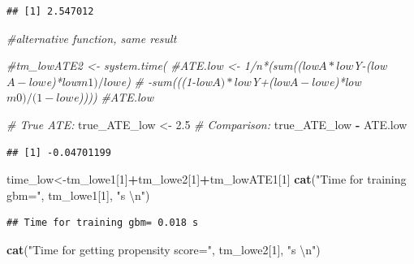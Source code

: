 \documentclass[]{article}
\newenvironment{Shaded}{\begin{snugshade}}{\end{snugshade}}
\newcommand{\CharTok}[1]{\textcolor[rgb]{0.31,0.60,0.02}{#1}}
\newcommand{\CommentTok}[1]{\textcolor[rgb]{0.56,0.35,0.01}{\textit{#1}}}
\newcommand{\DecValTok}[1]{\textcolor[rgb]{0.00,0.00,0.81}{#1}}
\newcommand{\FloatTok}[1]{\textcolor[rgb]{0.00,0.00,0.81}{#1}}
\newcommand{\KeywordTok}[1]{\textcolor[rgb]{0.13,0.29,0.53}{\textbf{#1}}}
\newcommand{\NormalTok}[1]{#1}
\newcommand{\OperatorTok}[1]{\textcolor[rgb]{0.81,0.36,0.00}{\textbf{#1}}}
\newcommand{\StringTok}[1]{\textcolor[rgb]{0.31,0.60,0.02}{#1}}
\begin{document}
\begin{verbatim}
## [1] 2.547012
\end{verbatim}

\begin{Shaded}
\begin{Highlighting}[]
\CommentTok{#alternative function, same result}

\CommentTok{#tm_lowATE2 <- system.time(}
\CommentTok{#ATE.low <- 1/n*(sum((low$A*low$Y-(low$A-low$e)*low$m1)/low$e)}
\CommentTok{#          -sum(((1-low$A)*low$Y+(low$A-low$e)*low$m0)/(1-low$e))))}
\CommentTok{#ATE.low}
\end{Highlighting}
\end{Shaded}

\begin{Shaded}
\begin{Highlighting}[]
\CommentTok{# True ATE:}
\NormalTok{true_ATE_low <-}\StringTok{ }\FloatTok{2.5}
\CommentTok{# Comparison:}
\NormalTok{true_ATE_low }\OperatorTok{-}\StringTok{ }\NormalTok{ATE.low}
\end{Highlighting}
\end{Shaded}

\begin{verbatim}
## [1] -0.04701199
\end{verbatim}

\begin{Shaded}
\begin{Highlighting}[]
\NormalTok{time_low<-tm_lowe1[}\DecValTok{1}\NormalTok{]}\OperatorTok{+}\NormalTok{tm_lowe2[}\DecValTok{1}\NormalTok{]}\OperatorTok{+}\NormalTok{tm_lowATE1[}\DecValTok{1}\NormalTok{]}
\KeywordTok{cat}\NormalTok{(}\StringTok{"Time for training gbm="}\NormalTok{, tm_lowe1[}\DecValTok{1}\NormalTok{], }\StringTok{"s }\CharTok{\textbackslash{}n}\StringTok{"}\NormalTok{)}
\end{Highlighting}
\end{Shaded}

\begin{verbatim}
## Time for training gbm= 0.018 s
\end{verbatim}

\begin{Shaded}
\begin{Highlighting}[]
\KeywordTok{cat}\NormalTok{(}\StringTok{"Time for getting propensity score="}\NormalTok{, tm_lowe2[}\DecValTok{1}\NormalTok{], }\StringTok{"s }\CharTok{\textbackslash{}n}\StringTok{"}\NormalTok{)}
\end{Highlighting}
\end{Shaded}
\end{document}
